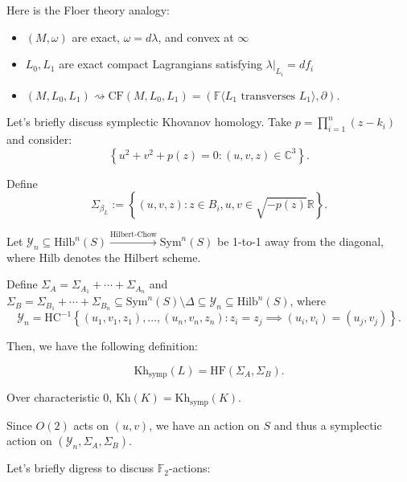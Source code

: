 Here is the Floer theory analogy:
\begin{itemize}
\item $(M,\omega)$ are exact, $\omega = d\lambda$, and convex at $\infty$
\item $L_0, L_1$ are exact compact Lagrangians satisfying $\lambda|_{L_i}=df_i$
\item $(M, L_0,L_1)\rightsquigarrow \text{CF}(M, L_0,L_1) = (\mathbb{F} \langle L_1 \text{ transverses }L_1 \rangle, \partial)$.
\end{itemize}

Let's briefly discuss symplectic Khovanov homology. Take $p = \prod_{i=1}^n (z - k_i)$ and consider:
\[
\left\{ u^2 + v^2 + p(z) = 0 : (u, v, z) \in \mathbb{C}^3 \right\}.
\]

Define
\[
\Sigma_{\beta_L}:= \left\{ (u, v, z) : z \in B_i, u, v \in \sqrt{-p(z)} \mathbb{R} \right\}.
\]

Let $\mathcal{Y}_n \subseteq \text{Hilb}^n(S) \xrightarrow{\text{Hilbert-Chow}} \text{Sym}^n(S)$ be 1-to-1 away from the diagonal, where $\text{Hilb}$ denotes the Hilbert scheme.

Define $\Sigma_A = \Sigma_{A_1} + \cdots + \Sigma_{A_n}$ and $\Sigma_B = \Sigma_{B_1} + \cdots + \Sigma_{B_n} \subseteq \text{Sym}^n(S) \setminus \Delta \subseteq \mathcal{Y}_n \subseteq \text{Hilb}^n(S)$, where
\[
\mathcal{Y}_n = \text{HC}^{-1}\left\{ (u_1, v_1, z_1), \ldots, (u_n, v_n, z_n) : z_i = z_j \implies (u_i, v_i) = (u_j, v_j) \right\}.
\]

Then, we have the following definition:

\begin{definition}

\[
\text{Kh}_{\text{symp}}(L) = \text{HF}(\Sigma_A, \Sigma_B).
\]

\end{definition}

\begin{theorem}

Over characteristic 0, $\text{Kh}(K)=\text{Kh}_{\text{symp}}(K)$.

\end{theorem}

Since $O(2)$ acts on $(u,v)$, we have an action on $S$ and thus a symplectic action on $(\mathcal{Y}_n, \Sigma_A, \Sigma_B)$.

Let's briefly digress to discuss $\mathbb{F}_2$-actions:

